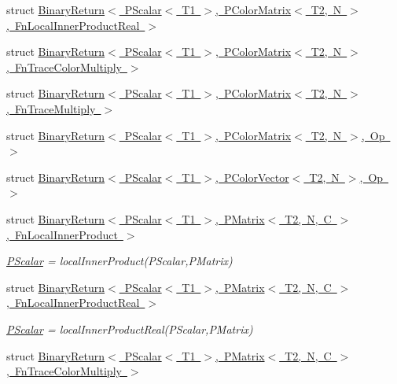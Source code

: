 \begin{DoxyCompactItemize}
struct \mbox{\hyperlink{structENSEM_1_1BinaryReturn_3_01PScalar_3_01T1_01_4_00_01PColorMatrix_3_01T2_00_01N_01_4_00_01FnLocalInnerProductReal_01_4}{Binary\+Return$<$ P\+Scalar$<$ T1 $>$, P\+Color\+Matrix$<$ T2, N $>$, Fn\+Local\+Inner\+Product\+Real $>$}}
\item 
struct \mbox{\hyperlink{structENSEM_1_1BinaryReturn_3_01PScalar_3_01T1_01_4_00_01PColorMatrix_3_01T2_00_01N_01_4_00_01FnTraceColorMultiply_01_4}{Binary\+Return$<$ P\+Scalar$<$ T1 $>$, P\+Color\+Matrix$<$ T2, N $>$, Fn\+Trace\+Color\+Multiply $>$}}
\item 
struct \mbox{\hyperlink{structENSEM_1_1BinaryReturn_3_01PScalar_3_01T1_01_4_00_01PColorMatrix_3_01T2_00_01N_01_4_00_01FnTraceMultiply_01_4}{Binary\+Return$<$ P\+Scalar$<$ T1 $>$, P\+Color\+Matrix$<$ T2, N $>$, Fn\+Trace\+Multiply $>$}}
\item 
struct \mbox{\hyperlink{structENSEM_1_1BinaryReturn_3_01PScalar_3_01T1_01_4_00_01PColorMatrix_3_01T2_00_01N_01_4_00_01Op_01_4}{Binary\+Return$<$ P\+Scalar$<$ T1 $>$, P\+Color\+Matrix$<$ T2, N $>$, Op $>$}}
\item 
struct \mbox{\hyperlink{structENSEM_1_1BinaryReturn_3_01PScalar_3_01T1_01_4_00_01PColorVector_3_01T2_00_01N_01_4_00_01Op_01_4}{Binary\+Return$<$ P\+Scalar$<$ T1 $>$, P\+Color\+Vector$<$ T2, N $>$, Op $>$}}
\item 
struct \mbox{\hyperlink{structENSEM_1_1BinaryReturn_3_01PScalar_3_01T1_01_4_00_01PMatrix_3_01T2_00_01N_00_01C_01_4_00_01FnLocalInnerProduct_01_4}{Binary\+Return$<$ P\+Scalar$<$ T1 $>$, P\+Matrix$<$ T2, N, C $>$, Fn\+Local\+Inner\+Product $>$}}
\begin{DoxyCompactList}\small\item\em \mbox{\hyperlink{classENSEM_1_1PScalar}{P\+Scalar}} = local\+Inner\+Product(\+P\+Scalar,\+P\+Matrix) \end{DoxyCompactList}\item 
struct \mbox{\hyperlink{structENSEM_1_1BinaryReturn_3_01PScalar_3_01T1_01_4_00_01PMatrix_3_01T2_00_01N_00_01C_01_4_00_01FnLocalInnerProductReal_01_4}{Binary\+Return$<$ P\+Scalar$<$ T1 $>$, P\+Matrix$<$ T2, N, C $>$, Fn\+Local\+Inner\+Product\+Real $>$}}
\begin{DoxyCompactList}\small\item\em \mbox{\hyperlink{classENSEM_1_1PScalar}{P\+Scalar}} = local\+Inner\+Product\+Real(\+P\+Scalar,\+P\+Matrix) \end{DoxyCompactList}\item 
struct \mbox{\hyperlink{structENSEM_1_1BinaryReturn_3_01PScalar_3_01T1_01_4_00_01PMatrix_3_01T2_00_01N_00_01C_01_4_00_01FnTraceColorMultiply_01_4}{Binary\+Return$<$ P\+Scalar$<$ T1 $>$, P\+Matrix$<$ T2, N, C $>$, Fn\+Trace\+Color\+Multiply $>$}}

\end{DoxyCompactItemize}

